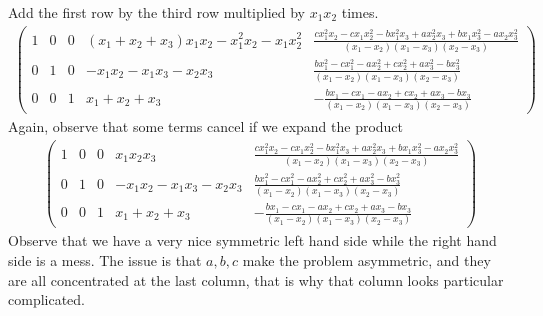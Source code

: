 Add the first row by the third row multiplied by $ x_1 x_2 $ times.
\begin{eqnarray*}
\left(\begin{array}{rrrr|r}
1 & 0 & 0 & {\left(x_{1} + x_{2} + x_{3}\right)} x_{1} x_{2} - x_{1}^{2} x_{2} - x_{1} x_{2}^{2} & \frac{c x_{1}^{2} x_{2} - c x_{1} x_{2}^{2} - b x_{1}^{2} x_{3} + a x_{2}^{2} x_{3} + b x_{1} x_{3}^{2} - a x_{2} x_{3}^{2}}{{\left(x_{1} - x_{2}\right)} {\left(x_{1} - x_{3}\right)} {\left(x_{2} - x_{3}\right)}} \\
0 & 1 & 0 & -x_{1} x_{2} - x_{1} x_{3} - x_{2} x_{3} & \frac{b x_{1}^{2} - c x_{1}^{2} - a x_{2}^{2} + c x_{2}^{2} + a x_{3}^{2} - b x_{3}^{2}}{{\left(x_{1} - x_{2}\right)} {\left(x_{1} - x_{3}\right)} {\left(x_{2} - x_{3}\right)}} \\
0 & 0 & 1 & x_{1} + x_{2} + x_{3} & -\frac{b x_{1} - c x_{1} - a x_{2} + c x_{2} + a x_{3} - b x_{3}}{{\left(x_{1} - x_{2}\right)} {\left(x_{1} - x_{3}\right)} {\left(x_{2} - x_{3}\right)}}
\end{array}\right)
\end{eqnarray*}
Again, observe that some terms cancel if we expand the product
\begin{eqnarray*}
\left(\begin{array}{rrrr|r}
1 & 0 & 0 & x_{1} x_{2} x_{3} & \frac{c x_{1}^{2} x_{2} - c x_{1} x_{2}^{2} - b x_{1}^{2} x_{3} + a x_{2}^{2} x_{3} + b x_{1} x_{3}^{2} - a x_{2} x_{3}^{2}}{{\left(x_{1} - x_{2}\right)} {\left(x_{1} - x_{3}\right)} {\left(x_{2} - x_{3}\right)}} \\
0 & 1 & 0 & -x_{1} x_{2} - x_{1} x_{3} - x_{2} x_{3} & \frac{b x_{1}^{2} - c x_{1}^{2} - a x_{2}^{2} + c x_{2}^{2} + a x_{3}^{2} - b x_{3}^{2}}{{\left(x_{1} - x_{2}\right)} {\left(x_{1} - x_{3}\right)} {\left(x_{2} - x_{3}\right)}} \\
0 & 0 & 1 & x_{1} + x_{2} + x_{3} & -\frac{b x_{1} - c x_{1} - a x_{2} + c x_{2} + a x_{3} - b x_{3}}{{\left(x_{1} - x_{2}\right)} {\left(x_{1} - x_{3}\right)} {\left(x_{2} - x_{3}\right)}}
\end{array}\right)
\end{eqnarray*}
Observe that we have a very nice symmetric left hand side while the right hand side is a mess. The issue is that $ a, b, c $ make the problem asymmetric, and they are all concentrated at the last column, that is why that column looks particular complicated.

